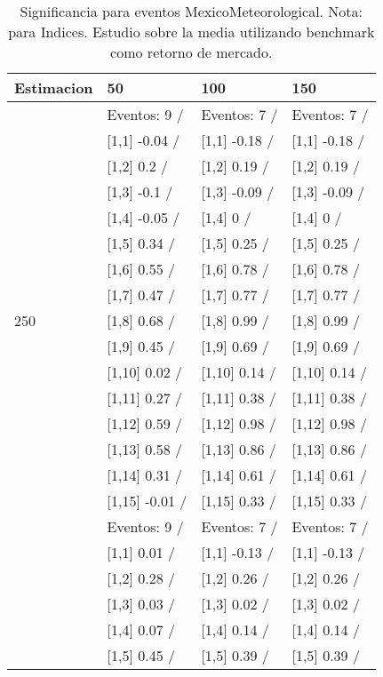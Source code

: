 \begin{table}

\caption{Significancia para eventos MexicoMeteorological. Nota: para Indices. Estudio sobre la media utilizando benchmark como retorno de mercado.}
\centering
\begin{tabular}[t]{llll}
\toprule
Estimacion & 50 & 100 & 150\\
\midrule
 & Eventos:  9 / & Eventos:  7 / & Eventos:  7 /\\
 & {}[1,1] -0.04  / & {}[1,1] -0.18  / & {}[1,1] -0.18  /\\
 & {}[1,2] 0.2  / & {}[1,2] 0.19  / & {}[1,2] 0.19  /\\
 & {}[1,3] -0.1  / & {}[1,3] -0.09  / & {}[1,3] -0.09  /\\
 & {}[1,4] -0.05  / & {}[1,4] 0  / & {}[1,4] 0  /\\
\addlinespace
 & {}[1,5] 0.34  / & {}[1,5] 0.25  / & {}[1,5] 0.25  /\\
 & {}[1,6] 0.55  / & {}[1,6] 0.78  / & {}[1,6] 0.78  /\\
 & {}[1,7] 0.47  / & {}[1,7] 0.77  / & {}[1,7] 0.77  /\\
250 & {}[1,8] 0.68  / & {}[1,8] 0.99  / & {}[1,8] 0.99  /\\
 & {}[1,9] 0.45  / & {}[1,9] 0.69  / & {}[1,9] 0.69  /\\
\addlinespace
 & {}[1,10] 0.02  / & {}[1,10] 0.14  / & {}[1,10] 0.14  /\\
 & {}[1,11] 0.27  / & {}[1,11] 0.38  / & {}[1,11] 0.38  /\\
 & {}[1,12] 0.59  / & {}[1,12] 0.98  / & {}[1,12] 0.98  /\\
 & {}[1,13] 0.58  / & {}[1,13] 0.86  / & {}[1,13] 0.86  /\\
 & {}[1,14] 0.31  / & {}[1,14] 0.61  / & {}[1,14] 0.61  /\\
\addlinespace
 & {}[1,15] -0.01  / & {}[1,15] 0.33  / & {}[1,15] 0.33  /\\
 & Eventos:  9 / & Eventos:  7 / & Eventos:  7 /\\
 & {}[1,1] 0.01  / & {}[1,1] -0.13  / & {}[1,1] -0.13  /\\
 & {}[1,2] 0.28  / & {}[1,2] 0.26  / & {}[1,2] 0.26  /\\
 & {}[1,3] 0.03  / & {}[1,3] 0.02  / & {}[1,3] 0.02  /\\
\addlinespace
 & {}[1,4] 0.07  / & {}[1,4] 0.14  / & {}[1,4] 0.14  /\\
 & {}[1,5] 0.45  / & {}[1,5] 0.39  / & {}[1,5] 0.39  /\\

\end{tabular}
\end{table}
